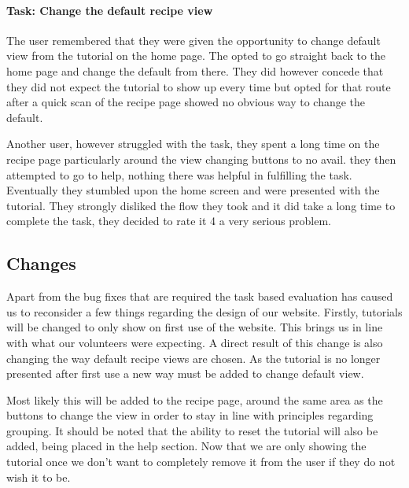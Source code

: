 \paragraph{Task: Change the default recipe view}

The user remembered that they were given the opportunity to change
default view from the tutorial on the home page. The opted to go
straight back to the home page and change the default from there. They
did however concede that they did not expect the tutorial to show up
every time but opted for that route after a quick scan of the recipe
page showed no obvious way to change the default.

Another user, however struggled with the task, they spent a long time
on the recipe page particularly around the view changing buttons to no
avail. they then attempted to go to help, nothing there was helpful in
fulfilling the task. Eventually they stumbled upon the home screen and
were presented with the tutorial. They strongly disliked the flow they
took and it did take a long time to complete the task, they decided to
rate it 4 a very serious problem.

\subsection{Changes}


Apart from the bug fixes that are required the task based evaluation
has caused us to reconsider a few things regarding the design of our
website. Firstly, tutorials will be changed to only show on first use
of the website. This brings us in line with what our volunteers were
expecting. A direct result of this change is also changing the way
default recipe views are chosen. As the tutorial is no longer
presented after first use a new way must be added to change default
view.

Most likely this will be added to the recipe page, around the same
area as the buttons to change the view in order to stay in line with
principles regarding grouping. It should be noted that the ability to
reset the tutorial will also be added, being placed in the help
section. Now that we are only showing the tutorial once we don’t want
to completely remove it from the user if they do not wish it to be.

